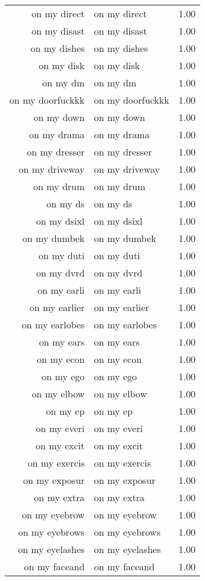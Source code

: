 \begin{table}[ht]
\begin{tabular}{rlr}
  on my direct & on my direct & 1.00 \\ 
  on my disast & on my disast & 1.00 \\ 
  on my dishes & on my dishes & 1.00 \\ 
  on my disk & on my disk & 1.00 \\ 
  on my dm & on my dm & 1.00 \\ 
  on my doorfuckkk & on my doorfuckkk & 1.00 \\ 
  on my down & on my down & 1.00 \\ 
  on my drama & on my drama & 1.00 \\ 
  on my dresser & on my dresser & 1.00 \\ 
  on my driveway & on my driveway & 1.00 \\ 
  on my drum & on my drum & 1.00 \\ 
  on my ds & on my ds & 1.00 \\ 
  on my dsixl & on my dsixl & 1.00 \\ 
  on my dumbek & on my dumbek & 1.00 \\ 
  on my duti & on my duti & 1.00 \\ 
  on my dvrd & on my dvrd & 1.00 \\ 
  on my earli & on my earli & 1.00 \\ 
  on my earlier & on my earlier & 1.00 \\ 
  on my earlobes & on my earlobes & 1.00 \\ 
  on my ears & on my ears & 1.00 \\ 
  on my econ & on my econ & 1.00 \\ 
  on my ego & on my ego & 1.00 \\ 
  on my elbow & on my elbow & 1.00 \\ 
  on my ep & on my ep & 1.00 \\ 
  on my everi & on my everi & 1.00 \\ 
  on my excit & on my excit & 1.00 \\ 
  on my exercis & on my exercis & 1.00 \\ 
  on my exposur & on my exposur & 1.00 \\ 
  on my extra & on my extra & 1.00 \\ 
  on my eyebrow & on my eyebrow & 1.00 \\ 
  on my eyebrows & on my eyebrows & 1.00 \\ 
  on my eyelashes & on my eyelashes & 1.00 \\ 
  on my faceand & on my faceand & 1.00 \\ 

\end{tabular}
\end{table}
